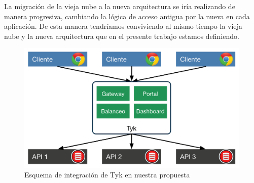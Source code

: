La migración de la vieja nube a la nueva arquitectura se iría realizando de manera progresiva, cambiando la lógica de acceso antigua por la nueva en cada aplicación.  De esta manera tendríamos conviviendo al mismo tiempo la vieja nube y la nueva arquitectura que en el presente trabajo estamos definiendo.

\begin{figure}[H]
  \includegraphics[width=\linewidth]{src/images/03-capitulo-3/tecnologias/tyk/tyk-integracion-arquitectura.png}
  \caption{Esquema de integración de Tyk en nuestra propuesta}
  \label{fig:integracion-tyk-arquitectura}
\end{figure}
